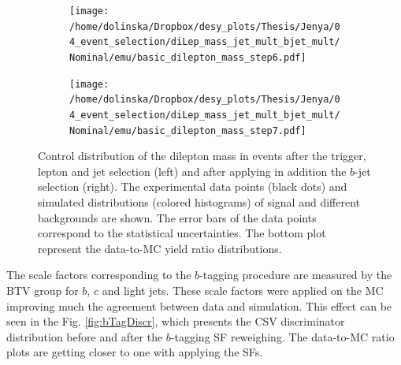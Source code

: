 \begin{itemize}
 \begin{figure}[h]
 \centering
 \begin{subfigure}
   \centering
   \texttt{[image: /home/dolinska/Dropbox/desy\_plots/Thesis/Jenya/04\_event\_selection/diLep\_mass\_jet\_mult\_bjet\_mult/Nominal/emu/basic\_dilepton\_mass\_step6.pdf]}
 \end{subfigure}
 \begin{subfigure}
   \centering
   \texttt{[image: /home/dolinska/Dropbox/desy\_plots/Thesis/Jenya/04\_event\_selection/diLep\_mass\_jet\_mult\_bjet\_mult/Nominal/emu/basic\_dilepton\_mass\_step7.pdf]}
 \end{subfigure}
 \caption{Control distribution of the dilepton mass in events after the trigger, lepton and jet selection (left) and after applying in addition the $b$-jet selection (right). 
 The experimental data points (black dots) and simulated distributions (colored histograms) of signal and different backgrounds are shown. The error bars of the data points
 correspond to the statistical uncertainties. The bottom plot represent the data-to-MC yield ratio distributions.}
 \label{fig:mllbJetSel}
 \end{figure}
 
 The scale factors corresponding to the $b$-tagging procedure are measured by the BTV group \cite{CMS-PAS-BTV-13-001} for $b$, $c$ and light jets. These scale factors were applied on the MC 
 improving much the agreement between data and simulation. This effect can be seen in the 
 Fig. \ref{fig:bTagDiscr}, which presents the CSV discriminator distribution before and after the $b$-tagging SF reweighing. The data-to-MC ratio plots are getting closer to one with
 applying the SFs.
 

\end{itemize}
